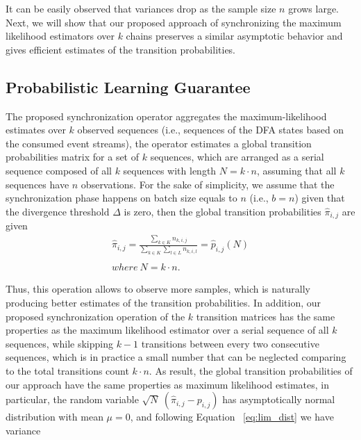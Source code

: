 It can be easily observed that variances drop as the sample size $n$ grows large.  Next, we will show that our proposed approach of synchronizing the maximum likelihood estimators over $k$ chains preserves a similar asymptotic behavior and gives efficient estimates of the transition probabilities.


\subsection{Probabilistic Learning Guarantee}
\label{sec:guarantee}
\par The proposed synchronization operator aggregates the maximum-likelihood estimates over $k$ observed sequences (i.e., sequences of the DFA states based on the consumed event streams), the operator estimates a global transition probabilities matrix for a set of $k$ sequences, which are arranged as a serial sequence composed of all $k$ sequences with length $N=k \cdot n$, assuming that all $k$ sequences have $n$ observations. For the sake of simplicity, we assume that the synchronization phase happens on batch size equals to $n$ (i.e., $b=n$) given that the divergence threshold $\Delta$ is zero, then the global transition probabilities $\hat{\pi}_{i,j}$ are given 
\begin{equation}
\label{eq:dis_pi_estim2}
	\begin{aligned}
\hat{\pi}_{i,j}=\frac{\sum_{k \in K} n_{k,i,j}}{\sum_{k \in K} \sum_{l \in L} n_{k,i,l}} = \hat{p}_{i,j}(N)\\\\
 where\ N = k \cdot n.
 \end{aligned}
\end{equation}

\par Thus, this operation allows to observe more samples, which is naturally producing better estimates of the transition probabilities. In addition, our proposed synchronization operation of the $k$ transition matrices has the same properties as the maximum likelihood estimator over a serial sequence of all $k$ sequences, while skipping $k-1$ transitions between every two consecutive sequences, which is in practice a small number that can be neglected comparing to the total transitions count $k \cdot n$. As result, the global transition probabilities of our approach  have the same properties as maximum likelihood estimates, in particular, the random variable $\sqrt{N}\ (\hat{\pi}_{i,j} - {p}_{i,j})$ has asymptotically normal distribution with mean $\mu=0$, and following Equation ~\ref{eq:lim_dist} we have variance 

